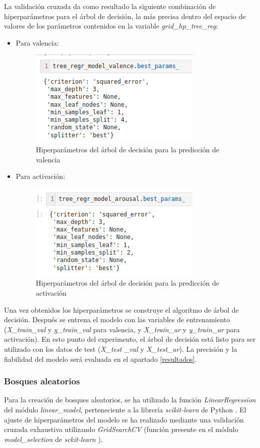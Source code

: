 \documentclass[12pt,a4paper,Spanish]{article}
\begin{document}
La validación cruzada da como resultado la siguiente combinación de hiperparámetros para el árbol de decisión, la más precisa dentro del espacio de valores de los parámetros contenidos en la variable \textit{grid\_hp\_tree\_reg}:
\begin{itemize}
	\item Para valencia:
	\begin{figure}[H]
		\centering
		\includegraphics[width=0.5\linewidth]{figs/final_params_tree}
		\caption{Hiperparámetros del árbol de decisión para la predicción de valencia}
		\label{fig:finalparamstree}
	\end{figure}
	\item Para activación:
	\begin{figure}[H]
		\centering
		\includegraphics[width=0.5\linewidth]{figs/final_params_tree_arousal}
		\caption{Hiperparámetros del árbol de decisión para la predicción de activación}
		\label{fig:finalparamstreearousal}
	\end{figure}
\end{itemize}
Una vez obtenidos los hiperparámetros se construye el algoritmo de árbol de decisión. Después se entrena el modelo con las variables de entrenamiento (\textit{X\_train\_val} y \textit{y\_train\_val} para valencia, y \textit{X\_train\_ar} y \textit{y\_train\_ar} para activación).
\newline
En esto punto del experimento, el árbol de decisión está listo para ser utilizado con los datos de test (\textit{X\_test \_val} y \textit{X\_test\_ar}). La precisión y la fiabilidad del modelo será evaluada en el apartado \ref{resultados}.

\subsubsection{Bosques aleatorios}
Para la creación de bosques aleatorios, se ha utilizado la función \textit{LinearRegression} del módulo \textit{linear\_model}, perteneciente a la librería \textit{scikit-learn} de Python \cite{scikit-learn}.
\newline
El ajuste de hiperparámetros del modelo se ha realizado mediante una validación cruzada exhaustiva utilizando \textit{GridSearchCV} (función presente en el módulo \textit{model\_selection} de \textit{sckit-learn} \cite{scikit-learn}).
\end{document}
